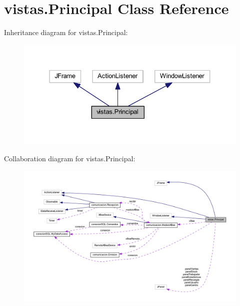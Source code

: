 \hypertarget{classvistas_1_1_principal}{}\section{vistas.\+Principal Class Reference}
\label{classvistas_1_1_principal}


Inheritance diagram for vistas.\+Principal\+:
\nopagebreak
\begin{figure}[H]
\begin{center}
\leavevmode
\includegraphics[width=331pt]{classvistas_1_1_principal__inherit__graph}
\end{center}
\end{figure}


Collaboration diagram for vistas.\+Principal\+:
\nopagebreak
\begin{figure}[H]
\begin{center}
\leavevmode
\includegraphics[width=350pt]{classvistas_1_1_principal__coll__graph}
\end{center}
\end{figure}
